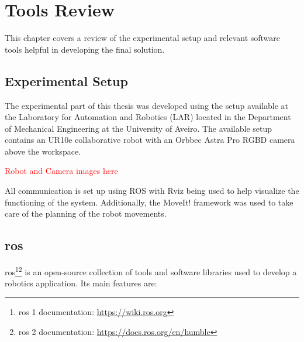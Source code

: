 \chapter{Tools Review}
\label{chapter:tools_review}

This chapter covers a review of the experimental setup and relevant software tools helpful in developing the final solution.

\section{Experimental Setup}

The experimental part of this thesis was developed using the setup available at the Laboratory for Automation and Robotics (LAR) located in the Department of Mechanical Engineering at the University of Aveiro. The available setup contains an UR10e collaborative robot with an Orbbec Astra Pro RGBD camera above the workspace.

\textcolor{red}{Robot and Camera images here}

All communication is set up using ROS with Rviz being used to help visualize the functioning of the system. Additionally, the MoveIt! framework was used to take care of the planning of the robot movements.

\section{\acf{ros}}

\acs{ros}\cite{ROS2}\footnote{\acs{ros} 1 documentation: \url{https://wiki.ros.org}}\footnote{\acs{ros} 2 documentation: \url{https://docs.ros.org/en/humble}} is an open-source collection of tools and software libraries used to develop a robotics application. Its main features are:

